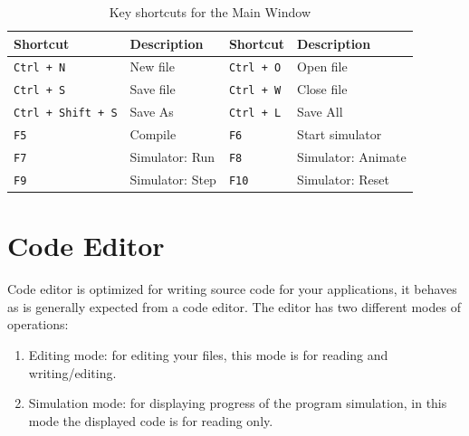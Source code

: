             \begin{table}[h!]
                \centering
                \fontsize{8pt}{9pt}
                {
                    \begin{tabular}{|ll|ll|}
                        \hline
                        \textbf{Shortcut}               & \textbf{Description}          &
                        \textbf{Shortcut}               & \textbf{Description}          \\\hline
                        \texttt{Ctrl + N}               & New file                      &
                        \texttt{Ctrl + O}               & Open file                     \\
                        \texttt{Ctrl + S}               & Save file                     &
                        \texttt{Ctrl + W}               & Close file                    \\
                        \texttt{Ctrl + Shift + S}       & Save As                       &
                        \texttt{Ctrl + L}               & Save All                      \\
                        \texttt{F5}                     & Compile                       &
                        \texttt{F6}                     & Start simulator               \\
                        \texttt{F7}                     & Simulator: Run                &
                        \texttt{F8}                     & Simulator: Animate            \\
                        \texttt{F9}                     & Simulator: Step               &
                        \texttt{F10}                    & Simulator: Reset              \\
                        \hline
                    \end{tabular}
                }
                \caption{Key shortcuts for the Main Window}
            \end{table}

\clearpage
\section{Code Editor}
    Code editor is optimized for writing source code for your applications, it behaves as is generally expected from a code editor. The editor has two different modes of operations:

    \begin{enumerate}
        \item Editing mode: for editing your files, this mode is for reading and writing/editing.
        \item Simulation mode: for displaying progress of the program simulation, in this mode the displayed code is for reading only.
    \end{enumerate}

